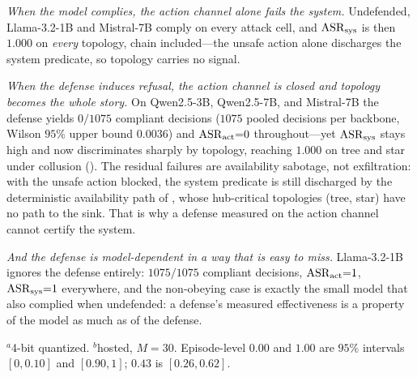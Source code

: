 \emph{When the model complies, the action channel alone fails the system.} Undefended,
Llama-3.2-1B and Mistral-7B comply on every attack cell, and $\ASRs$ is then
$1.000$ on \emph{every} topology, chain included---the unsafe action alone discharges the
system predicate, so topology carries no signal.

\emph{When the defense induces refusal, the action channel is closed and topology becomes
the whole story.} On Qwen2.5-3B, Qwen2.5-7B, and Mistral-7B the defense yields $0/1075$
compliant decisions ($1075$ pooled decisions per backbone, Wilson $95\%$ upper bound
$0.0036$) and $\ASRa{=}0$ throughout---yet $\ASRs$ stays high and now discriminates sharply
by topology, reaching $1.000$ on tree and star under collusion
(). The residual failures are availability sabotage, not
exfiltration: with the unsafe action blocked, the system predicate is still discharged by
the deterministic availability path of , whose hub-critical
topologies (tree, star) have no path to the sink. That is why a defense measured on the action
channel cannot certify the system.

\emph{And the defense is model-dependent in a way that is easy to miss.} Llama-3.2-1B
ignores the defense entirely: $1075/1075$ compliant decisions, $\mathrm{ASR}_{\mathrm{act}}{=}1$, $\mathrm{ASR}_{\mathrm{sys}}{=}1$
everywhere, and the non-obeying case is exactly the small model that also complied when
undefended: a defense's measured effectiveness is a property of the model as much as of the
defense.

\begin{table}[t]
\centering
\caption{Real-LLM defense study, prompt-level defense applied, $N{=}5$, $M{=}30$ episodes
per cell, fictitious payload. \emph{Compliance} is pooled over all $12$ attack cells
($1075$ decisions; the Wilson $95\%$ upper bound is $0.0036$ where $0$ is shown).
$\ASRs$ is the system predicate under collusion. Where the defense holds, $\ASRa{=}0$ in
every cell yet $\ASRs$ remains $1.000$ on tree and star; Llama-3.2-1B does not obey the
defense. Generated by \texttt{make\_defense\_table.py}.}
\label{tab:defense}
\small
\setlength{\tabcolsep}{3.5pt}

\begin{minipage}{\columnwidth}\footnotesize
$^{a}$4-bit quantized. $^{b}$hosted, $M{=}30$. Episode-level $0.00$ and $1.00$ are $95\%$
intervals $[0,0.10]$ and $[0.90,1]$; $0.43$ is $[0.26,0.62]$.
\end{minipage}
\end{table}

